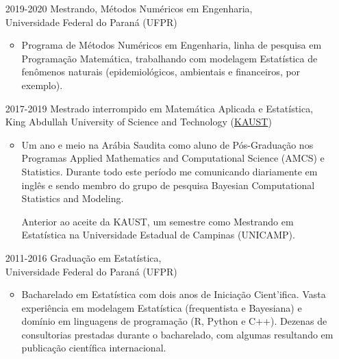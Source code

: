 \documentclass[12pt]{article}
\begin{document}
\begin{itemize}
 \item[2019-2020] Mestrando, M\'{e}todos Num\'{e}ricos em Engenharia,\\
                  Universidade Federal do Paran\'{a} (UFPR)
  \begin{itemize}
   \item Programa de M\'{e}todos Num\'{e}ricos em Engenharia, linha de
         pesquisa em Programa\c{c}\~{a}o Matem\'{a}tica, trabalhando com
         modelagem Estat\'{i}stica de fen\^{o}menos naturais
         (epidemiol\'{o}gicos, ambientais e financeiros, por exemplo).
  \end{itemize}

 \item[2017-2019] Mestrado interrompido em Matem\'{a}tica Aplicada e
                  Estat\'{i}stica,\\
                  King Abdullah University of Science and Technology
                  (\href{https://kaust.edu.sa/en}{KAUST})
  \begin{itemize}
   \item Um ano e meio na Ar\'{a}bia Saudita como aluno de
         P\'{o}s-Gradua\c{c}\~{a}o nos Programas Applied Mathematics and
         Computational Science (AMCS) e Statistics. Durante todo este
         per\'{i}odo me comunicando diariamente em ingl\^{e}s e sendo
         membro do grupo de pesquisa Bayesian Computational Statistics
         and Modeling.

         Anterior ao aceite da KAUST, um semestre como Mestrando em
         Estat\'{i}stica na Universidade Estadual de Campinas (UNICAMP).
  \end{itemize}

 \item[2011-2016] Gradua\c{c}\~{a}o em Estat\'{i}stica,\\
                  Universidade Federal do Paran\'{a} (UFPR)
  \begin{itemize}
   \item Bacharelado em Estat\'{i}stica com dois anos de Inicia\c{c}\~{a}o
         Cient'{i}fica. Vasta experi\^{e}ncia em modelagem Estat\'{i}stica
         (frequentista e Bayesiana) e dom\'{i}nio em linguagens de
         programa\c{c}\~{a}o (R, Python e C++). Dezenas de  consultorias
         prestadas durante o bacharelado, com algumas resultando em
         publica\c{c}\~{a}o cient\'{i}fica internacional.
  \end{itemize}
\end{itemize}
\end{document}
